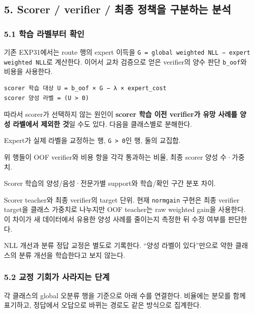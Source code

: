\subsection{5. Scorer /\allowbreak{} verifier /\allowbreak{} 최종 정책을 구분하는 분석}
\subsubsection{5.1 학습 라벨부터 확인}
기존 EXP31에서는 route 행의 expert 이득을 \texttt{G =\allowbreak{}\allowbreak{} glob\allowbreak{}al weigh\allowbreak{}ted NLL \allowbreak{}− expert\allowbreak{} weighte\allowbreak{}d NLL}로 계산한다. 이어서 교차 검증으로 얻은 verifier의 양수 판단 \texttt{b\_\allowbreak{}\allowbreak{}oof}와 비용을 사용한다.


\begin{Verbatim}[breaklines=true,breakanywhere=true,fontsize=\scriptsize]
scorer 학습 대상 U = b_oof × G − λ × expert_cost
scorer 양성 라벨 = (U > 0)

\end{Verbatim}
따라서 scorer가 선택하지 않는 원인이 \textbf{scorer 학습 이전 verifier가 유망 사례를 양성 라벨에서 제외한 것}일 수도 있다. 다음을 클래스별로 분해한다.

\par\noindent \textbullet\enspace Expert가 실제 라벨을 교정하는 행, \texttt{G > 0}인 행, 둘의 교집합.


\par\noindent \textbullet\enspace 위 행들이 OOF verifier와 비용 항을 각각 통과하는 비율, 최종 scorer 양성 수·가중치.


\par\noindent \textbullet\enspace Scorer 학습의 양성/\allowbreak{}음성·전문가별 support와 학습/\allowbreak{}확인 구간 분포 차이.


\par\noindent \textbullet\enspace Scorer teacher와 최종 verifier의 target 단위. 현재 \texttt{normgain\allowbreak{}} 구현은 최종 verifier target을 클래스 가중치로 나누지만 OOF teacher는 raw weighted gain을 사용한다. 이 차이가 새 데이터에서 유용한 양성 사례를 줄이는지 측정한 뒤 수정 여부를 판단한다.


NLL 개선과 분류 정답 교정은 별도로 기록한다. “양성 라벨이 있다”만으로 약한 클래스의 분류 개선을 학습한다고 보지 않는다.

\subsubsection{5.2 교정 기회가 사라지는 단계}
각 클래스의 global 오분류 행을 기준으로 아래 수를 연결한다. 비율에는 분모를 함께 표기하고, 정답에서 오답으로 바뀌는 경로도 같은 방식으로 집계한다.

